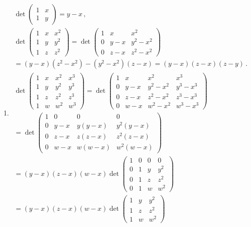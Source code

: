 \begin{enumerate}
\item 
\begin{gather*}
\det \begin{pmatrix}1 & x\\ 1 & y\end{pmatrix}=y-x\, ,\ \ 
\\
\det \begin{pmatrix}1 & x & x^2\\ 1 & y&y^2\\ 1& z&z^2\end{pmatrix}=
\det \begin{pmatrix}1 & x & x^2\\ 0 & y-x&y^2-x^2\\ 0& z-x&z^2-x^2\end{pmatrix}\\
=(y-x)(z^2-x^2)-(y^2-x^2)(z-x)=(y-x)(z-x)(z-y)\, .
\\
\det \begin{pmatrix}1 & x & x^2 & x^3\\ 1 & y& y^2 & y^3\\ 1 & z & z^2 & z^3\\ 1 & w & w^2 & w^3\end{pmatrix}
=
\det \begin{pmatrix}1 & x & x^2 & x^3\\ 0 & y-x& y^2-x^2 & y^3-x^3\\ 0 & z-x & z^2 -x^2& z^3-x^3\\ 0 & w-x & w^2-x^2 & w^3-x^3\end{pmatrix}
\\
=
\det \begin{pmatrix}1 & 0 & 0 & 0\\ 0 & y-x& y(y-x)& y^2(y-x)\\ 0 & z-x & z(z-x) & z^2(z-x)\\ 0 & w-x & w(w-x) & w^2(w-x)\end{pmatrix}
\\=
(y-x)(z-x)(w-x)\det \begin{pmatrix}1 & 0 & 0 & 0\\ 0 & 1& y& y^2\\ 0 & 1 & z & z^2\\ 0 & 1 & w & w^2\end{pmatrix}
\\
=(y-x)(z-x)(w-x)\det \begin{pmatrix}1 & y & y^2\\ 1 & z&z^2\\ 1& w&w^2\end{pmatrix}

\end{gather*}
\end{enumerate}
